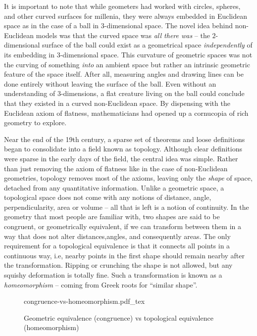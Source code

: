 It is important to note that while geometers had worked with circles, spheres, and other curved surfaces for millenia, they were always embedded in Euclidean space as in the case of a ball in $3$-dimensional space. The novel idea behind non-Euclidean models was that the curved space was \emph{all there was} -- the $2$-dimensional surface of the ball could exist as a geometrical space \emph{independently} of its embedding in $3$-dimensional space.
This curvature of geometric spaces was not the curving of something \emph{into} an ambient space but rather an intrinsic geometric feature of the space itself. After all, measuring angles and drawing lines can be done entirely without leaving the surface of the ball. Even without an understanding of $3$-dimensions, a flat creature living on the ball could conclude that they existed in a curved non-Euclidean space.
By dispensing with the Euclidean axiom of flatness, mathematicians had opened up a cornucopia of rich geometry to explore.
%

Near the end of the 19th century, a sparse set of theorems and loose definitions began to consolidate into a field known as topology. Although clear definitions were sparse in the early days of the field, the central idea was simple. Rather than just removing the axiom of flatness like in the case of non-Euclidean geometries, topology removes most of the axioms, leaving only the \emph{shape} of space, detached from any quantitative information. Unlike a geometric space, a topological space does not come with any notions of distance, angle, perpendicularity, area or volume -- all that is left is a notion of continuity.
In the geometry that most people are familiar with, two shapes are said to be congruent, or geometrically equivalent, if we can transform between them in a way that does not alter distances,angles, and consequently areas.
The only requirement for a topological equivalence is that it connects all points in a continuous way, i.e, nearby points in the first shape should remain nearby after the transformation. Ripping or crunching the shape is not allowed, but any squishy deformation is totally fine. Such a transformation is known as a \emph{homeomorphism} -- coming from Greek roots for ``similar shape''.
\begin{figure}[ht]
	\centering
	{congruence-vs-homeomorphism.pdf_tex}
	\caption{Geometric equivalence (congruence) vs topological equivalence (homeomorphism)}
\end{figure}

